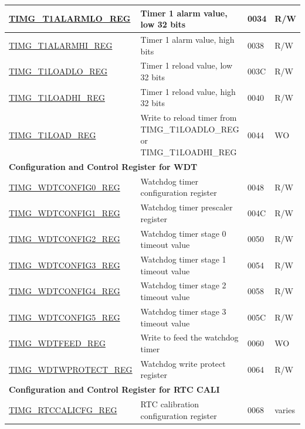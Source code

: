 \begin{longtable}{ | p{6cm} | p{7.2cm} | p{1.3cm} | p{1cm} | }
\hyperref[regdesc:TIMGTXALARMLOREG]{TIMG\_T1ALARMLO\_REG} & Timer 1 alarm value, low 32 bits & \hexprefix{}0034 & R/W \\ \hline
\hyperref[regdesc:TIMGTXALARMHIREG]{TIMG\_T1ALARMHI\_REG} & Timer 1 alarm value, high bits & \hexprefix{}0038 & R/W \\ \hline
\hyperref[regdesc:TIMGTXLOADLOREG]{TIMG\_T1LOADLO\_REG} & Timer 1 reload value, low 32 bits & \hexprefix{}003C & R/W \\ \hline
\hyperref[regdesc:TIMGTXLOADHIREG]{TIMG\_T1LOADHI\_REG} & Timer 1 reload value, high 32 bits & \hexprefix{}0040 & R/W \\ \hline
\hyperref[regdesc:TIMGTXLOADREG]{TIMG\_T1LOAD\_REG} & Write to reload timer from TIMG\_T1LOADLO\_REG or TIMG\_T1LOADHI\_REG & \hexprefix{}0044 & WO \\ \hline
\multicolumn{4}{|l|}{\textbf{Configuration and Control Register for WDT}} \\ \hline
\hyperref[regdesc:TIMGWDTCONFIG0REG]{TIMG\_WDTCONFIG0\_REG} & Watchdog timer configuration register & \hexprefix{}0048 & R/W \\ \hline
\hyperref[regdesc:TIMGWDTCONFIG1REG]{TIMG\_WDTCONFIG1\_REG} & Watchdog timer prescaler register & \hexprefix{}004C & R/W \\ \hline
\hyperref[regdesc:TIMGWDTCONFIG2REG]{TIMG\_WDTCONFIG2\_REG} & Watchdog timer stage 0 timeout value & \hexprefix{}0050 & R/W \\ \hline
\hyperref[regdesc:TIMGWDTCONFIG3REG]{TIMG\_WDTCONFIG3\_REG} & Watchdog timer stage 1 timeout value & \hexprefix{}0054 & R/W \\ \hline
\hyperref[regdesc:TIMGWDTCONFIG4REG]{TIMG\_WDTCONFIG4\_REG} & Watchdog timer stage 2 timeout value & \hexprefix{}0058 & R/W \\ \hline
\hyperref[regdesc:TIMGWDTCONFIG5REG]{TIMG\_WDTCONFIG5\_REG} & Watchdog timer stage 3 timeout value & \hexprefix{}005C & R/W \\ \hline
\hyperref[regdesc:TIMGWDTFEEDREG]{TIMG\_WDTFEED\_REG} & Write to feed the watchdog timer & \hexprefix{}0060 & WO \\ \hline
\hyperref[regdesc:TIMGWDTWPROTECTREG]{TIMG\_WDTWPROTECT\_REG} & Watchdog write protect register & \hexprefix{}0064 & R/W \\ \hline
\multicolumn{4}{|l|}{\textbf{Configuration and Control Register for RTC CALI}} \\ \hline
\hyperref[regdesc:TIMGRTCCALICFGREG]{TIMG\_RTCCALICFG\_REG} & RTC calibration configuration register & \hexprefix{}0068 & varies \\ \hline

\end{longtable}
